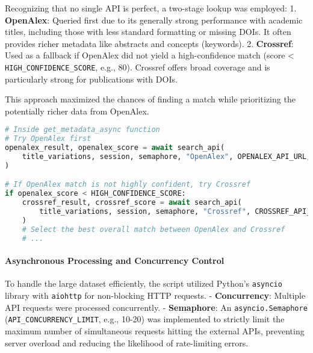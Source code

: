 \documentclass[12pt]{article}
\begin{document}
Recognizing that no single API is perfect, a two-stage lookup was
employed: 1. \textbf{OpenAlex}: Queried first due to its generally
strong performance with academic titles, including those with less
standard formatting or missing DOIs. It often provides richer metadata
like abstracts and concepts (keywords). 2. \textbf{Crossref}: Used as a
fallback if OpenAlex did not yield a high-confidence match (score
\textless{} \texttt{HIGH\_CONFIDENCE\_SCORE}, e.g., 80). Crossref offers
broad coverage and is particularly strong for publications with DOIs.

This approach maximized the chances of finding a match while
prioritizing the potentially richer data from OpenAlex.

\begin{lstlisting}[language=Python]
# Inside get_metadata_async function
# Try OpenAlex first
openalex_result, openalex_score = await search_api(
    title_variations, session, semaphore, "OpenAlex", OPENALEX_API_URL, OPENALEX_DELAY, record_id
)

# If OpenAlex match is not highly confident, try Crossref
if openalex_score < HIGH_CONFIDENCE_SCORE:
    crossref_result, crossref_score = await search_api(
        title_variations, session, semaphore, "Crossref", CROSSREF_API_URL, CROSSREF_DELAY, record_id
    )
    # Select the best overall match between OpenAlex and Crossref
    # ...
\end{lstlisting}

\paragraph{Asynchronous Processing and Concurrency
Control}\label{asynchronous-processing-and-concurrency-control}

To handle the large dataset efficiently, the script utilized Python's
\texttt{asyncio} library with \texttt{aiohttp} for non-blocking HTTP
requests. - \textbf{Concurrency}: Multiple API requests were processed
concurrently. - \textbf{Semaphore}: An \texttt{asyncio.Semaphore}
(\texttt{API\_CONCURRENCY\_LIMIT}, e.g., 10-20) was implemented to
strictly limit the maximum number of simultaneous requests hitting the
external APIs, preventing server overload and reducing the likelihood of
rate-limiting errors.
\end{document}
